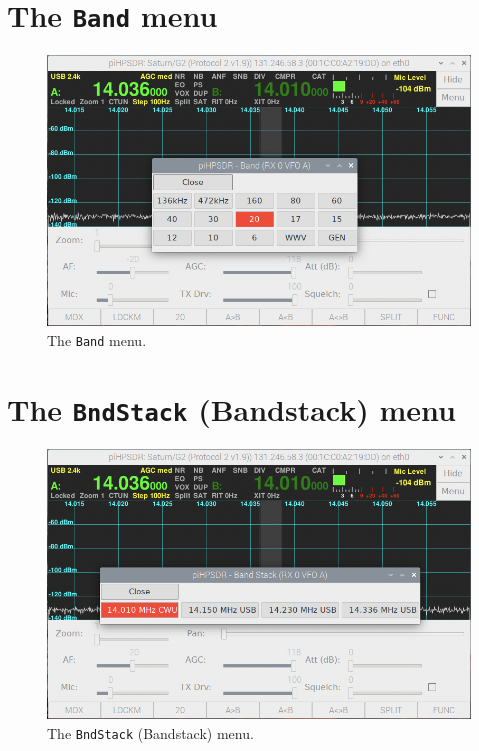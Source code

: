 \documentclass[12pt]{book}
\def\bltt#1{\texttt{\color{blue}#1}}
\begin{document}
\section{The \texttt{Band} menu}
\begin{figure}[h]
\center
\includegraphics[width=12cm]{BandMenu.png}
\caption{The \bltt{Band} menu.}
\label{fig:BandMenu}
\end{figure}

\section{The  \texttt{BndStack} (Bandstack) menu}
\begin{figure}[h]
\center
\includegraphics[width=12cm]{BandstackMenu.png}
\caption{The \bltt{BndStack} (Bandstack) menu.}
\label{fig:BandstackMenu}
\end{figure}
 
\end{document}
